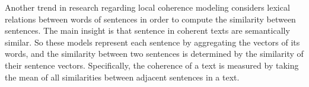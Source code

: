 

Another trend in research regarding local coherence modeling considers lexical relations between words of sentences in order to compute the similarity between sentences.    
The main insight is that sentence in coherent texts are semantically similar. 
So these models represent each sentence by aggregating the vectors of its words, and the similarity between two sentences is determined by the similarity of their sentence vectors. 
Specifically, the coherence of a text is measured by taking the mean of all similarities between adjacent sentences in a text. 

